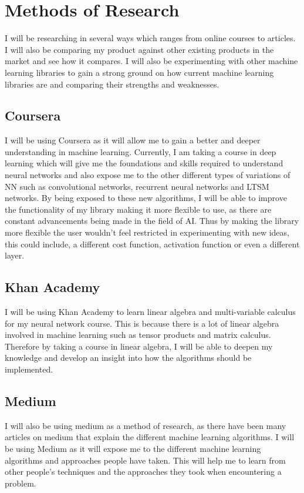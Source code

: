 \section{Methods of Research}
I will be researching in several ways which ranges from online courses to articles. I will also be comparing my product against other existing products in the market and see how it compares. I will also be experimenting with other machine learning libraries to gain a strong ground on how current machine learning libraries are and comparing their strengths and weaknesses.

\subsection{Coursera}
I will be using Coursera as it will allow me to gain a better and deeper understanding in machine learning. Currently, I am taking a course in deep learning which will give me the foundations and skills required to understand neural networks and also expose me to the other different types of variations of NN such as convolutional networks, recurrent neural networks and LTSM networks. By being exposed to these new algorithms, I will be able to improve the functionality of my library making it more flexible to use, as there are constant advancements being made in the field of AI. Thus by making the library more flexible the user wouldn't feel restricted in experimenting with new ideas, this could include, a different cost function, activation function or even a different layer.

\subsection{Khan Academy}
I will be using Khan Academy to learn linear algebra and multi-variable calculus for my neural network course. This is because there is a lot of linear algebra involved in machine learning such as tensor products and matrix calculus. Therefore by taking a course in linear algebra, I will be able to deepen my knowledge and develop an insight into how the algorithms should be implemented. 

\subsection{Medium}
I will also be using medium as a method of research, as there have been many articles on medium that explain the different machine learning algorithms. I will be using Medium as it will expose me to the different machine learning algorithms and approaches people have taken. This will help me to learn from other people's techniques and the approaches they took when encountering a problem.